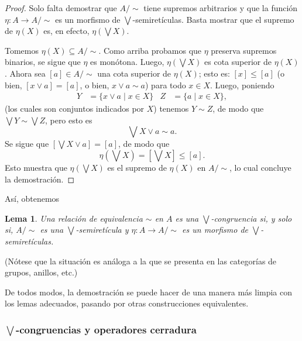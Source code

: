 \documentclass[12pt,letterpaper,titlepage]{article}
\newtheorem{lemma}{Lema}
\theoremstyle{definition}
\renewcommand\sup{\vee}
\newcommand\Sup{\bigvee}
\newcommand\simr{{\sim}}
\newcommand\tps[2]{\texorpdfstring{#1}{#2}}
\newcommand\<{\langle}
\renewcommand\>{\rangle}
\begin{document}
\begin{proof}
    Solo falta demostrar que $A/\simr$ tiene supremos arbitrarios y
    que la función $\eta:A\to A/\simr$ es un morfismo de
    $\Sup$-semiretículas.
    Basta mostrar que el supremo de $\eta(X)$ es,
    en efecto, $\eta(\Sup X)$.
    
    Tomemos $\eta(X)\subseteq A/\simr$.
    Como arriba probamos que $\eta$ preserva supremos binarios,
    se sigue que $\eta$ es monótona.
    Luego, $\eta(\Sup X)$ es cota superior de $\eta(X)$.
    Ahora sea $[a]\in A/\simr$ una cota superior de $\eta(X)$;
    esto es: $[x]\leq[a]$
    (o bien, $[x\sup a]=[a]$, o bien, $x\sup a\sim a$)
    para todo $x\in X$.
    Luego, poniendo
    \begin{align*}
        Y &= \{x\sup a\mid x\in X\}
        &
        Z &=\{a\mid x\in X\},
    \end{align*}
    (los cuales son conjuntos indicados por $X$)
    tenemos $Y\sim Z$, de modo que $\Sup Y\sim\Sup Z$, pero esto es
    \[
        \Sup X\sup a\sim a
    .\]
    Se sigue que $[\Sup X\sup a]=[a]$, de modo que
    \[
        \eta(\Sup X)=[\Sup X]\leq [a]
    .\]
    Esto muestra que $\eta(\Sup X)$ es el supremo de $\eta(X)$
    en $A/\simr$, lo cual concluye la demostración.
\end{proof}

Así, obtenemos
\begin{lemma}
    Una relación de equivalencia $\simr$ en $A$ es una $\Sup$-congruencia
    si, y solo si, $A/\simr$ es una $\Sup$-semiretícula y
    $\eta:A\to A/\simr$ es un morfismo de $\Sup$-semiretículas.
\end{lemma}
(Nótese que la situación es análoga a la que se presenta en
las categorías de grupos, anillos, etc.)


De todos modos, la demostración se puede hacer de una manera más limpia
con los lemas adecuados, pasando por otras construcciones equivalentes.

\subsubsection{\tps{$\Sup$}{Sup}-congruencias y operadores cerradura}
\end{document}
